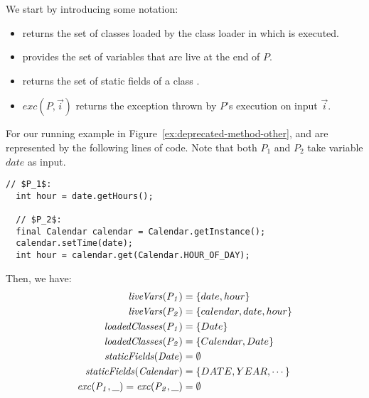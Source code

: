 \documentclass[sigconf,review,anonymous]{acmart}
\begin{document}


We start by introducing some notation:
\begin{itemize}
\item {} returns the set of classes loaded by the class loader
  in which  is executed.
\item {} provides the set of variables that are live
at the end of $P$. %
\item {} returns
  the set of static fields of a class .
\item $exc(P, \vec{i})$ returns the exception thrown by $P$'s execution on input $\vec{i}$.  
\end{itemize}  

\begin{example}\label{ex:defs}
  For our running example in Figure~\ref{ex:deprecated-method-other},
   and  are represented by the following lines of code. Note that
  both $P_1$ and $P_2$ take variable $date$ as input.

\begin{lstlisting}[mathescape=true,showstringspaces=false]
  // $P_1$:
  int hour = date.getHours();

  // $P_2$:
  final Calendar calendar = Calendar.getInstance();
  calendar.setTime(date);
  int hour = calendar.get(Calendar.HOUR_OF_DAY);
\end{lstlisting}
%
Then, we have:
\[
\begin{aligned}[t]
  \mathit{{liveVars(P_1)}} &= \{date, hour\}\\
  \mathit{{liveVars(P_2)}} &= \{calendar, date, hour\}\\  
  \mathit{{loadedClasses(P_1)}} &= \{Date\} \\
  \mathit{{loadedClasses(P_2)}} &= \{Calendar, Date\} \\  
  \mathit{{staticFields(Date)}} &= \emptyset\\
  \mathit{{staticFields(Calendar)}} &= \{DATE, YEAR, \cdots\}\\
  \mathit{{exc(P_1, \_)}}=\mathit{{exc(P_2, \_)}} &=\emptyset
\end{aligned}
\]
\end{example}
\end{document}
